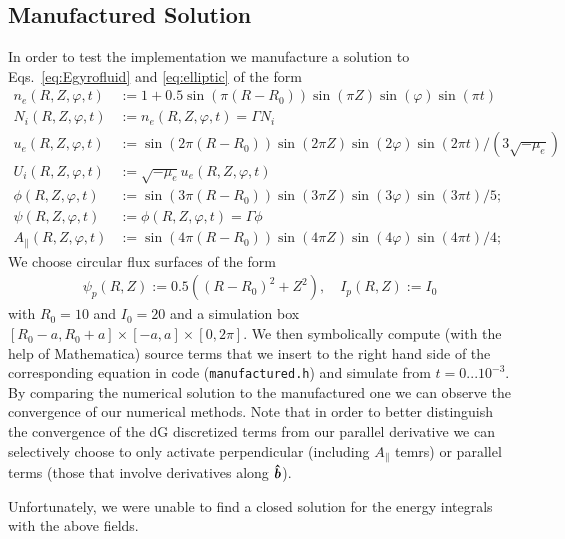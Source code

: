 \subsection{Manufactured Solution}
In order to test the implementation we manufacture a solution to Eqs.~\eqref{eq:Egyrofluid} and \eqref{eq:elliptic} of the form
\begin{align*}
n_e(R,Z,\varphi, t) &:= 1 + 0.5\sin(\pi(R-R_0))\sin(\pi Z)\sin(\varphi)\sin(\pi t) \\
N_i(R,Z,\varphi, t) &:= n_e(R,Z,\varphi,t) = \Gamma N_i  \\
u_e(R,Z,\varphi, t) &:= \sin(2\pi(R-R_0))\sin(2\pi Z)\sin(2\varphi)\sin(2\pi t)/(3\sqrt{-\mu_e}) \\
U_i(R,Z,\varphi, t) &:= \sqrt{-\mu_e}u_e(R,Z,\varphi,t) \\
\phi(R,Z,\varphi,t) &:= \sin(3\pi(R-R_0))\sin(3\pi Z)\sin(3\varphi)\sin(3\pi t)/5; \\
\psi(R,Z,\varphi,t) &:= \phi(R,Z,\varphi, t) = \Gamma \phi \\
A_\parallel( R,Z,\varphi,t) &:= \sin(4\pi(R-R_0))\sin(4\pi Z)\sin(4\varphi)\sin(4\pi t)/4;
\end{align*}
We choose circular flux surfaces of the form
\begin{align*}
\psi_p(R,Z) :=0.5((R-R_0)^2 + Z^2),\quad
I_p(R,Z):=I_0
\end{align*}
with $R_0=10$ and $I_0=20$ and a simulation box $[R_0-a,R_0+a]\times[-a,a]\times[0,2\pi]$.
We then symbolically compute (with the help of Mathematica) source terms that we insert to the right hand side of
the corresponding equation in code (\texttt{manufactured.h}) and simulate from $t=0...10^{-3}$.
By comparing the numerical solution to the manufactured one we can observe the convergence of our numerical methods. Note that in order to better distinguish
the convergence of the dG discretized terms from our parallel derivative
we can selectively choose to only activate perpendicular (including $A_\parallel$ temrs) or parallel terms (those that involve derivatives along $\bm{\hat{b}}$).

Unfortunately, we were unable to find a closed solution for the energy integrals with the above fields.

